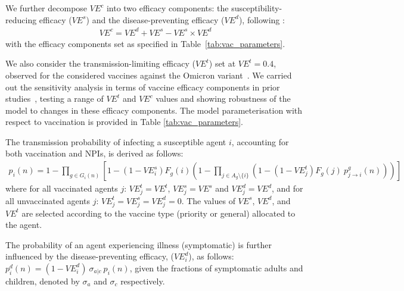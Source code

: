 \documentclass{article}
\begin{document}
\begin{appendices}
We further decompose $VE^c$ into two efficacy components: the susceptibility-reducing efficacy ($VE^s$) and the disease-preventing efficacy ($VE^d$), following \cite{zachreson_how_2021, chang_simulating_2022, chang_persistence_2023}:
\begin{eqnarray}
    VE^c = VE^d + VE^s - VE^s \times VE^d
    \label{eq:VEc}
\end{eqnarray}
with the efficacy components set as specified in Table~\ref{tab:vac_parameters}.

We also consider the transmission-limiting efficacy ($VE^t$) set at $VE^t = 0.4$, observed for the considered vaccines against the Omicron variant~\cite{jamanetworkopen.2022}. We carried out the sensitivity analysis in terms of vaccine efficacy components in prior studies~\cite{zachreson_how_2021,chang_simulating_2022}, testing a range of  $VE^t$ and $VE^c$ values and showing  robustness of the model to changes in these efficacy components. The model parameterisation with respect to vaccination is provided in Table \ref{tab:vac_parameters}.

The transmission probability of infecting a susceptible agent $i$, accounting for both vaccination and NPIs, is derived as follows:
\begin{eqnarray}
    p_i(n) =  1 - \prod_{g \in G_i(n)} \left [1 - (1 - VE^s_i) F_g(i) \left( 1 - \prod_{j \in A_g\setminus \{i\}} (1 - (1 - VE^t_j) F_g(j) \ p^g_{j \rightarrow i}(n))  \right) \right ]
		\label{eq-ve}
\end{eqnarray}
where for all vaccinated agents $j$: $VE^t_j = VE^t$, $VE^s_j = VE^s$ and $VE^d_j = VE^d$, and for all unvaccinated agents $j$:  $VE^t_j = VE^s_j = VE^d_j = 0$. The values of $VE^s$, $VE^d$, and $VE^t$ are selected according to the vaccine type (priority or general) allocated to the agent.

The probability of an agent experiencing illness (symptomatic) is further influenced by the disease-preventing efficacy, ($VE^d_i$), as follows: $p^d_i(n) = (1 - VE^d_i) \ \sigma_{a|c} \ p_i(n)$, given the fractions of symptomatic adults and children, denoted by $\sigma_a$ and $\sigma_c$ respectively.


\end{appendices}
\end{document}
